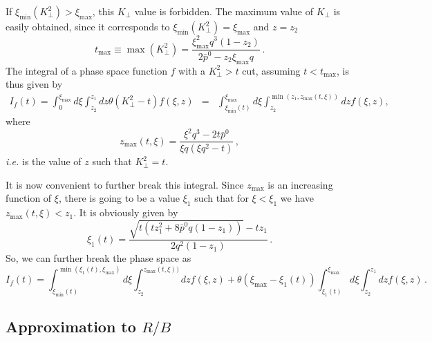 \documentclass[11pt,a4paper]{article}
\begin{document}
If $\xi_{\min} (K_{\perp}^2) > \xi_{\max}$, this $K_{\perp}$ value is
forbidden. The maximum value of $K_{\perp}$ is easily obtained, since it
corresponds to $\xi_{\min} (K_{\perp}^2) = \xi_{\max}$ and $z = z_2$
\[ t_{\max} \equiv \max (K_{\perp}^2) = \frac{\xi_{\max}^2 q^3 \left( 1 - z_2
   \right)}{2 \bar{p}^0 - z_2 \xi_{\max} q} \, . \]
The integral of a phase space function $f$ with a $K_{\perp}^2 > t$ cut,
assuming $t < t_{\max}$, is thus given by
\begin{eqnarray}
 \!\!\!\!\!\!\! I_f (t) = \!\! \int_0^{\xi_{\max}} d \xi \int_{z_2}^{z_1} dz \theta \left(
  K_{\perp}^2 - t \right) f (\xi, z) & = & \!\!\! \int_{\xi_{\min} (t)}^{\xi_{\max}}
  d \xi \int^{\min (z_1, z_{\max} (t, \xi))}_{z_2} dzf (\xi, z), 
\end{eqnarray}
where
\begin{equation}
  z_{\max} (t, \xi) = \frac{\xi^2 q^3 - 2 t \bar{p}^0}{\xi q (\xi q^2 - t)} \, ,
  \label{eq:zmaxdef}
\end{equation}
{\it i.e.} is the value of $z$ such that $K_{\perp}^2 = t$.

It is now convenient to further break this integral. Since $z_{\max}$ is an
increasing function of $\xi$, there is going to be a value $\xi_1$ such that
for $\xi < \xi_1$ we have $z_{\max} (t, \xi) < z_1$. It is obviously given by
\begin{equation}
  \xi_1 (t) = \frac{\sqrt{t \left( tz_1^2 + 8 \bar{p}^0 q (1 - z_1) \right)} -
  tz_1}{2 q^2 (1 - z_1)} \, .
\end{equation}
So, we can further break the phase space as
\begin{equation}
  I_f (t) = \int_{\xi_{\min} (t)}^{\min (\xi_1 (t), \xi_{\max})} d \xi
  \int^{z_{\max} (t, \xi))}_{z_2} dzf (\xi, z) + \theta (\xi_{\max} - \xi_1
  (t)) \int_{\xi_1 (t)}^{\xi_{\max}} d \xi \int^{z_1}_{z_2} dzf (\xi, z) \, .
\end{equation}

\subsection{Approximation to $R / B$}
\end{document}

